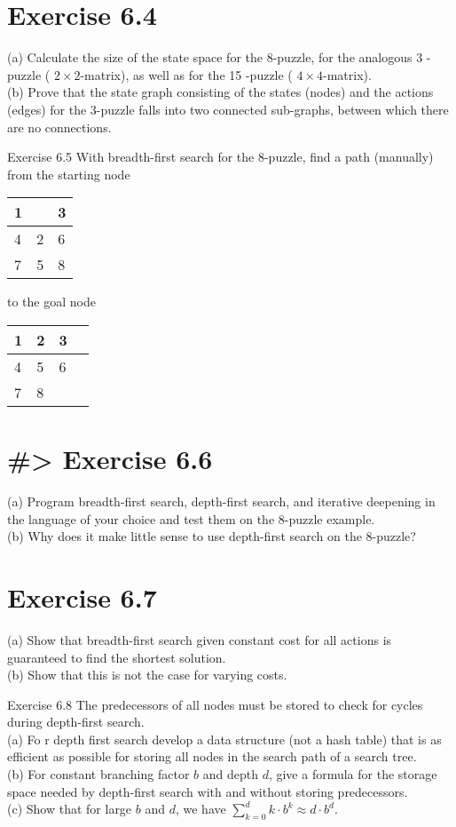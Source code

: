\documentclass[10pt]{article}
\begin{document}
\section*{Exercise 6.4}
(a) Calculate the size of the state space for the 8-puzzle, for the analogous 3 -puzzle ( $2 \times 2$-matrix), as well as for the 15 -puzzle ( $4 \times 4$-matrix).\\
(b) Prove that the state graph consisting of the states (nodes) and the actions (edges) for the 3-puzzle falls into two connected sub-graphs, between which there are no connections.

Exercise 6.5 With breadth-first search for the 8-puzzle, find a path (manually) from the starting node

\begin{center}
\begin{tabular}{|l|l|l|}
\hline
1 &  & 3 \\
\hline
4 & 2 & 6 \\
\hline
7 & 5 & 8 \\
\hline
\end{tabular}
\end{center} to the goal node \begin{tabular}{|l|l|l|l|}
\hline
1 & 2 & 3 \\
\hline
4 & 5 & 6 \\
\hline
7 & 8 &  \\
\hline
\end{tabular}

\section*{\#> Exercise 6.6}
(a) Program breadth-first search, depth-first search, and iterative deepening in the language of your choice and test them on the 8-puzzle example.\\
(b) Why does it make little sense to use depth-first search on the 8-puzzle?

\section*{Exercise 6.7}
(a) Show that breadth-first search given constant cost for all actions is guaranteed to find the shortest solution.\\
(b) Show that this is not the case for varying costs.

Exercise 6.8 The predecessors of all nodes must be stored to check for cycles during depth-first search.\\
(a) Fo
r depth first search develop a data structure (not a hash table) that is as efficient as possible for storing all nodes in the search path of a search tree.\\
(b) For constant branching factor $b$ and depth $d$, give a formula for the storage space needed by depth-first search with and without storing predecessors.\\
(c) Show that for large $b$ and $d$, we have $\sum_{k=0}^{d} k \cdot b^{k} \approx d \cdot b^{d}$.
\end{document}
